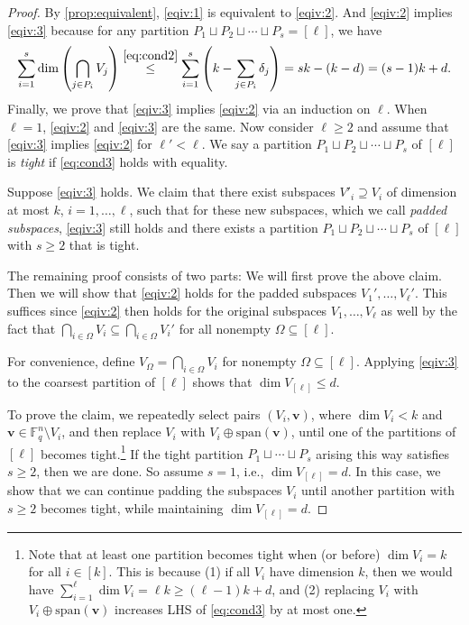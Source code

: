 \documentclass[10pt,a4paper]{amsart}
\newcommand{\bv}{\bm{v}}
\begin{document}
\begin{proof}
By \cref{prop:equivalent}, \cref{eqiv:1} is equivalent to \cref{eqiv:2}. 
And \cref{eqiv:2} implies \cref{eqiv:3} because for any partition $P_1\sqcup P_2\sqcup\cdots\sqcup P_s=[\ell]$, we have 
\[
\sum_{i=1}^s \dim\left(\bigcap_{j\in P_i} V_j\right)\stackrel{\eqref{eq:cond2}}{\leq} \sum_{i=1}^s \left(k-\sum_{j\in P_i}\delta_j\right)=sk-(k-d)=(s-1)k+d.
\]
Finally, we prove that \cref{eqiv:3} implies \cref{eqiv:2} via an induction on $\ell$. 
When $\ell=1$, \cref{eqiv:2} and \cref{eqiv:3} are the same.
Now consider $\ell\geq 2$ and assume that \cref{eqiv:3} implies \cref{eqiv:2} for $\ell'<\ell$.
We say a partition $P_1\sqcup P_2\sqcup\cdots\sqcup P_s$ of $[\ell]$ is \emph{tight} if \eqref{eq:cond3} holds with equality.

Suppose \cref{eqiv:3} holds. We claim that there exist subspaces $V'_i\supseteq V_i$ of dimension at most $k$,
$i=1,\dots,\ell$, such that for these new subspaces, which we call \emph{padded subspaces}, \cref{eqiv:3} still holds and there exists a partition $P_1\sqcup P_2\sqcup\cdots\sqcup P_s$ of $[\ell]$ with $s\geq 2$ that is tight.

The remaining proof consists of two parts: We will first prove the above claim. Then we will show that \cref{eqiv:2} holds for the padded subspaces $V_1',\dots,V_\ell'$.
This suffices since \cref{eqiv:2} then holds for the original subspaces $V_1,\dots,V_\ell$ as well by the fact that $\bigcap_{i\in \Omega}V_i \subseteq  \bigcap_{i\in \Omega}V_i'$ for all nonempty $\Omega\subseteq [\ell]$.

For convenience, define $V_\Omega=\bigcap_{i\in\Omega} V_i$ for nonempty $\Omega\subseteq [\ell]$.
Applying \cref{eqiv:3} to the coarsest partition of $[\ell]$ shows that $\dim V_{[\ell]}\leq d$.

To prove the claim, we repeatedly select pairs $(V_i, \bv)$, where $\dim V_i < k$ and $\bv \in \mathbb{F}_q^n \setminus V_i$, and then replace $V_i$ with $V_i \oplus \mathrm{span}(\bv)$, until one of the partitions of $[\ell]$ becomes tight.\footnote{Note that at least one partition becomes tight when (or before) $\dim V_i=k$ for all $i\in [k]$. This is because (1) if all $V_i$ have dimension $k$, then we would have $\sum_{i=1}^\ell \dim V_i=\ell k\geq (\ell-1)k+d$, and (2) replacing $V_i$ with $V_i \oplus \mathrm{span}(\bv)$ increases LHS of \eqref{eq:cond3} by at most one.}
If the tight partition $P_1\sqcup \cdots\sqcup P_s$ arising this way satisfies $s\geq 2$, then we are done. So assume $s=1$, i.e., $\dim V_{[\ell]}=d$. In this case, we show that we can continue padding the subspaces $V_i$ until another partition with $s\ge2$ becomes tight, while maintaining $\dim V_{[\ell]} = d$.


\end{proof}
\end{document}
